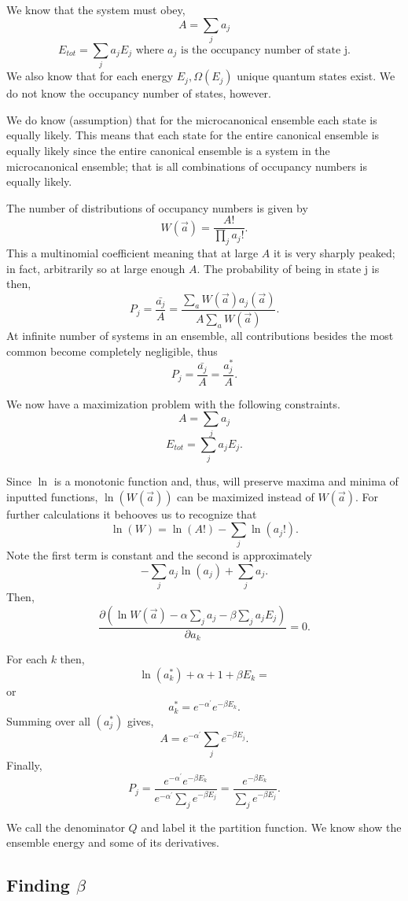 We know that the system must obey, \[ A = \sum_j{a_j} \]\[ E_{tot} = \sum_j{a_j
E_j} \text{ where } a_j \text{ is the occupancy number of state j}.\] We also
know that for each energy $ E_j, \Omega(E_j) $ unique quantum states exist. We
do not know the occupancy number of states, however.

We do know (assumption) that for the microcanonical ensemble each state is
equally likely. This means that each state for the entire canonical ensemble is
equally likely since the entire canonical ensemble is a system in the
microcanonical ensemble; that is all combinations of occupancy numbers is
equally likely.

The number of distributions of occupancy numbers is given by \[ W(\vec{a}) =
\frac{A!}{ \prod_{j}{a_j!}}.\]  This a multinomial coefficient meaning that
at large $A$ it is very sharply peaked; in fact, arbitrarily so at large
enough $A$. The probability of being in state j is then, \[ P_j =
\frac{\bar{a_j}}{A} = \frac{\sum_a{W(\vec{a})a_j(\vec{a})}}{A
\sum_a{W(\vec{a})}}.\] At infinite number of systems in an
ensemble, all contributions besides the most common become
completely negligible, thus \[ P_j = \frac{\bar{a_j}}{A} =
\frac{a_j^{*}}{A}.\] 

We now have a maximization problem with the following constraints.
\[ A = \sum_{j}{a_j} \]
\[ E_{tot} = \sum_{j}{a_j E_j}.\]

Since $\ln$ is a monotonic function and, thus, will preserve maxima and minima of
inputted functions, $\ln(W(\vec{a}))$ can be maximized instead of $W(\vec{a})$.
For further calculations it behooves us to recognize that \[ \ln(W) = \ln(A!) -
\sum_j{\ln(a_j!)}.\] Note the first term is constant and the second is
approximately \[-\sum_j{a_j \ln(a_j)} + \sum_{j}{a_j}.\]
Then,
\[ \frac{\partial ( \ln W(\vec{a}) - \alpha \sum_{j}{a_j} - \beta \sum_j{a_j
E_j})}{\partial a_{k}} = 0. \]


For each $k$ then, \[ \ln(a^*_k)+ \alpha + 1 + \beta E_k = \] or \[ a_k^* =
e^{-\alpha^{'}}e^{-\beta E_{k}}.\] Summing over all $(a_j^*)$ gives, \[ A =
e^{ -\alpha^{'}}\sum_{j}{e^{ - \beta E_j}}. \] Finally, \[ P_j =
\frac{e^{-\alpha^{'}}e^{-\beta E_{k}}}{e^{ -\alpha^{'}}\sum_j{e^{ -\beta E_{j}}}} =
\frac{e^{-\beta E_k}}{\sum_j{e^{ -\beta E_j}}}.\]

We call the denominator $Q$ and label it the partition function. We know show
the ensemble energy and some of its derivatives.

\subsection{Finding $\beta$}

